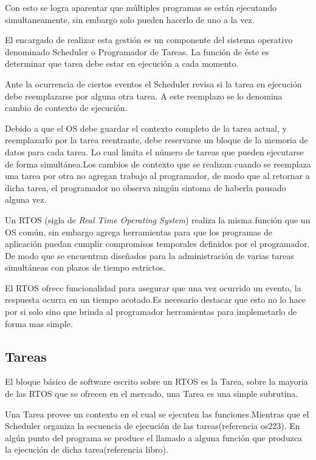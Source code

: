 \documentclass[12pt,letterpaper]{article}
\begin{document}
Con esto se logra aparentar que múltiples programas se están ejecutando simultaneamente, sin embargo solo pueden hacerlo de uno a la vez.

El encargado de realizar esta gestión es un componente del sistema operativo denominado Scheduler o Programador de Tareas. La función de éste es determinar que tarea debe estar en ejecución a cada momento.

Ante la ocurrencia de ciertos eventos el Scheduler revisa si la tarea en ejecución debe reemplazarse por alguna otra tarea. A este reemplazo se lo denomina cambio de contexto de ejecución.

Debido a que el OS debe guardar el contexto completo de la tarea actual, y reemplazarlo por la tarea reentrante, debe reservarse un bloque de la memoria de datos para cada tarea. Lo cual limita el número de tareas que pueden ejecutarse de forma simultánea.Los cambios de contexto que se realizan cuando se reemplaza una tarea por otra no agregan trabajo al programador, de modo que al retornar a dicha tarea, el programador no observa ningún sintoma de haberla pausado alguna vez.

Un RTOS (sigla de \textit{Real Time Operating System}) realiza la misma función que un OS común, sin embargo agrega herramientas para que los programas de aplicación puedan cumplir compromisos temporales definidos por el programador. De modo que se encuentran diseñados para la administración de varias tareas simultáneas con plazos de tiempo estrictos.

El RTOS ofrece funcionalidad para asegurar que una vez ocurrido un evento, la respuesta ocurra en un tiempo acotado.Es necesario destacar que esto no lo hace por si solo sino que brinda al programador herramientas para implemetarlo de forma mas simple.

\subsection{Tareas}\label{sec:tareas}
El bloque básico de software escrito sobre un RTOS es la Tarea, sobre la mayoria de las RTOS que se ofrecen en el mercado, una Tarea es una simple subrutina\cite{librodertoseningles}.

Una Tarea provee un contexto en el cual se ejecuten las funciones.Mientras que el Scheduler organiza la secuencia de ejecución de las tareas(referencia os223).
En algún punto del programa se produce el llamado a alguna función que produzca la ejecución de dicha tarea(referencia libro).
\end{document}
